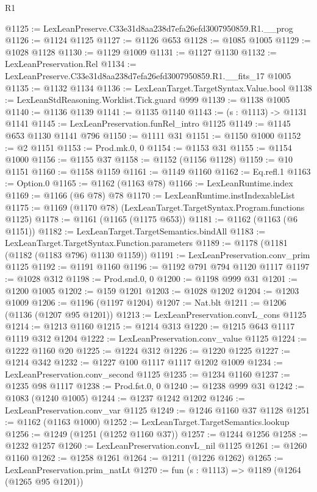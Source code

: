 \begin{lexlean}{R1}
\begin{coremodule}
@1125 := LexLeanPreserve.C33e31d8aa238d7efa26efd3007950859.R1.__prog
@1126 := @1124 @1125
@1127 := @1126 @653
@1128 := @1085 @1005
@1129 := @1028 @1128
@1130 := @1129 @1009
@1131 := @1127 @1130
@1132 := LexLeanPreservation.Rel
@1134 := LexLeanPreserve.C33e31d8aa238d7efa26efd3007950859.R1.__fits_17 @1005
@1135 := @1132 @1134
@1136 := LexLeanTarget.TargetSyntax.Value.bool
@1138 := LexLeanStdReasoning.Worklist.Tick.guard @999
@1139 := @1138 @1005
@1140 := @1136 @1139
@1141 := @1135 @1140
@1143 := (s : @1113) -> @1131 @1141
@1145 := LexLeanPreservation.funRel_intro @1125
@1149 := @1145 @653 @1130 @1141 @796
@1150 := @1111 @31
@1151 := @1150 @1000
@1152 := @2 @1151
@1153 := Prod.mk.{0, 0}
@1154 := @1153 @31
@1155 := @1154 @1000
@1156 := @1155 @37
@1158 := @1152 (@1156 @1128)
@1159 := @10 @1151
@1160 := @1158 @1159
@1161 := @1149 @1160
@1162 := Eq.refl.{1}
@1163 := Option.{0}
@1165 := @1162 (@1163 @78)
@1166 := LexLeanRuntime.index
@1169 := @1166 (@6 @78) @78
@1170 := LexLeanRuntime.instIndexableList
@1175 := @1169 (@1170 @78) (LexLeanTarget.TargetSyntax.Program.functions @1125)
@1178 := @1161 (@1165 (@1175 @653))
@1181 := @1162 (@1163 (@6 @1151))
@1182 := LexLeanTarget.TargetSemantics.bindAll
@1183 := LexLeanTarget.TargetSyntax.Function.parameters
@1189 := @1178 (@1181 (@1182 (@1183 @796) @1130 @1159))
@1191 := LexLeanPreservation.conv_prim @1125
@1192 := @1191 @1160
@1196 := @1192 @791 @794 @1120 @1117
@1197 := @1028 @312
@1198 := Prod.snd.{0, 0}
@1200 := @1198 @999 @31
@1201 := @1200 @1005
@1202 := @159 @1201
@1203 := @1028 @1202
@1204 := @1203 @1009
@1206 := @1196 (@1197 @1204)
@1207 := Nat.blt
@1211 := @1206 (@1136 (@1207 @95 @1201))
@1213 := LexLeanPreservation.convL_cons @1125
@1214 := @1213 @1160
@1215 := @1214 @313
@1220 := @1215 @643 @1117 @1119 @312 @1204
@1222 := LexLeanPreservation.conv_value @1125
@1224 := @1222 @1160 @20
@1225 := @1224 @312
@1226 := @1220 @1225
@1227 := @1214 @342
@1232 := @1227 @100 @1117 @1117 @1202 @1009
@1234 := LexLeanPreservation.conv_second @1125
@1235 := @1234 @1160
@1237 := @1235 @98 @1117
@1238 := Prod.fst.{0, 0}
@1240 := @1238 @999 @31
@1242 := @1083 (@1240 @1005)
@1244 := @1237 @1242 @1202
@1246 := LexLeanPreservation.conv_var @1125
@1249 := @1246 @1160 @37 @1128
@1251 := @1162 (@1163 @1000)
@1252 := LexLeanTarget.TargetSemantics.lookup
@1256 := @1249 (@1251 (@1252 @1160 @37))
@1257 := @1244 @1256
@1258 := @1232 @1257
@1260 := LexLeanPreservation.convL_nil @1125
@1261 := @1260 @1160
@1262 := @1258 @1261
@1264 := @1211 (@1226 @1262)
@1265 := LexLeanPreservation.prim_natLt
@1270 := fun (s : @1113) => @1189 (@1264 (@1265 @95 @1201))

\end{coremodule}
\end{lexlean}
